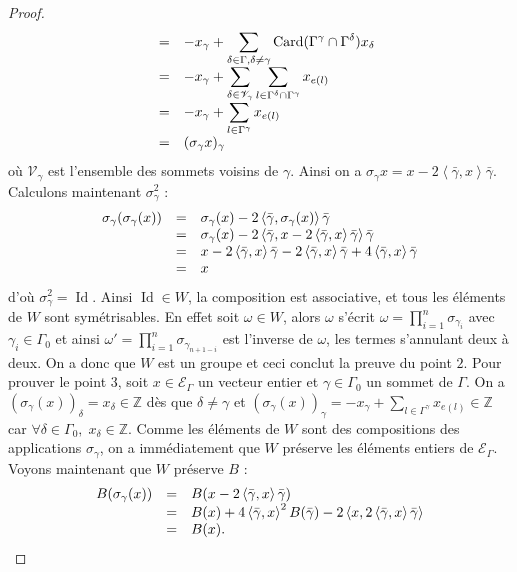 \documentclass[a4paper,10pt]{article}
\DeclareMathOperator{\Id}{Id}
\DeclareMathOperator{\Card}{Card}
\newcommand{\ps}[2]{\left\langle#1,#2\right\rangle}
\newcommand{\EG}{\mathscr{E}_\Gamma}
\newcommand{\dps}{\displaystyle}
\begin{document}
\begin{proof}
\[\begin{array}{>{\dps}r>{\dps}l>{\dps}l}
			&=& -x_\gamma+\sum_{\delta\in\Gamma,\delta\neq\gamma}\Card(\Gamma^\gamma\cap\Gamma^\delta) x_\delta\\
			&=& -x_\gamma+\sum_{\delta\in \mathscr V_\gamma}\sum_{l\in\Gamma^\delta\cap\Gamma^\gamma}x_{e(l)}\\
			&=& -x_\gamma+\sum_{l\in\Gamma^\gamma}x_{e(l)}\\
			&=& (\sigma_\gamma x)_\gamma
		\end{array}
			\]
			où $\mathscr V_\gamma$ est l'ensemble des sommets voisins de $\gamma$. Ainsi on a $\sigma_\gamma x=x-2\ps{\bar\gamma}{x}\bar\gamma$. Calculons maintenant $\sigma_\gamma^2$ :
			\[
		\begin{array}{>{\dps}r>{\dps}l>{\dps}l}
			\sigma_\gamma(\sigma_\gamma(x))&=& \sigma_\gamma(x)-2\ps{\bar\gamma}{\sigma_\gamma(x)}\bar\gamma\\
			&=& \sigma_\gamma(x)-2\ps{\bar\gamma}{x-2\ps{\bar\gamma}{x}\bar\gamma}\bar\gamma\\
			&=& x-2\ps{\bar\gamma}{x}\bar\gamma-2\ps{\bar\gamma}{x}\bar\gamma+4\ps{\bar\gamma}{x}\bar\gamma\\
			&=& x\\
		\end{array}
			\]
			d'où $\sigma_\gamma^2=\Id$. Ainsi $\Id\in W$, la composition est associative, et tous les éléments de $W$ sont symétrisables. En effet soit $\omega\in W$, alors $\omega$ s'écrit $\omega=\prod_{i=1}^n \sigma_{\gamma_i}$ avec $\gamma_i\in\Gamma_0$ et ainsi $\omega'=\prod_{i=1}^n \sigma_{\gamma_{n+1-i}}$ est l'inverse de $\omega$, les termes s'annulant deux à deux. On a donc que $W$ est un groupe et ceci conclut la preuve du point $2$. Pour prouver le point $3$, soit $x\in\EG$ un vecteur entier et $\gamma\in\Gamma_0$ un sommet de $\Gamma$. On a $(\sigma_\gamma(x))_\delta=x_\delta\in\mathbb Z$ dès que $\delta\neq\gamma$ et $(\sigma_\gamma(x))_\gamma=-x_\gamma+\sum_{l\in\Gamma^\gamma}x_{e(l)}\in\mathbb Z$ car $\forall \delta\in\Gamma_0,\;x_\delta\in\mathbb Z$. Comme les éléments de $W$ sont des compositions des applications $\sigma_\gamma$, on a immédiatement que $W$ préserve les éléments entiers de $\EG$. Voyons maintenant que $W$ préserve $B$ :
			\[
		\begin{array}{>{\dps}r>{\dps}l>{\dps}l}
			B(\sigma_\gamma(x))&=& B(x-2\ps{\bar\gamma}{x}\bar\gamma)\\
			&=& B(x)+4\ps{\bar\gamma}{x}^2B(\bar\gamma)-2\ps{x}{2\ps{\bar\gamma}{x}\bar\gamma}\\
			&=& B(x).
		\end{array}
\]
\end{proof}
\end{document}
